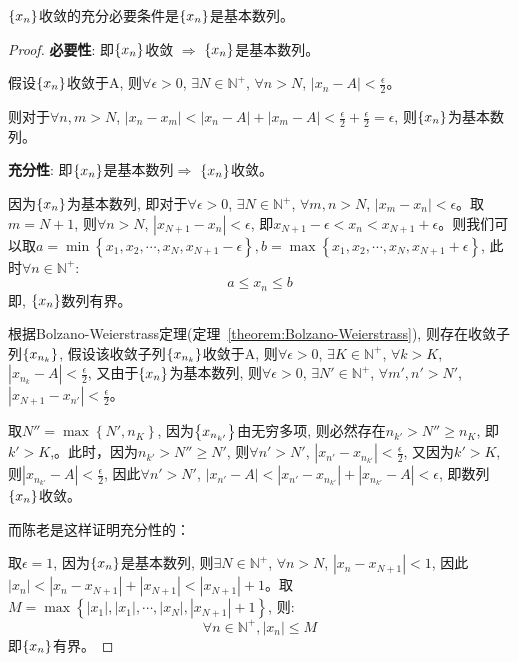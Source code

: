 \documentclass[lang=cn]{elegantbook}
\begin{document}
\begin{theorem}[Cauchy收敛原理]
    $\left\{ x_n\right\}$收敛的充分必要条件是$\left\{ x_n\right\}$是基本数列。
\end{theorem}
\begin{proof}
{\bf 必要性}: 即$\left\{ x_n\right\}$收敛 $\Rightarrow$ $\left\{ x_n\right\}$是基本数列。

假设$\left\{ x_n\right\}$收敛于A, 则$\forall \epsilon > 0$, $\exists N \in \mathbb{N}^+$, $\forall n > N$, $\left| x_n - A \right| < \frac{\epsilon}{2}$。

则对于$\forall n, m > N$, $\left| x_n - x_m \right| < \left| x_n - A \right| + \left| x_m - A \right| < \frac{\epsilon}{2} + \frac{\epsilon}{2} = \epsilon $, 则$\left\{ x_n\right\}$为基本数列。

{\bf 充分性}: 即$\left\{ x_n\right\}$是基本数列$\Rightarrow$ $\left\{ x_n\right\}$收敛。

因为$\left\{ x_n\right\}$为基本数列, 即对于$\forall \epsilon > 0$, $\exists N \in \mathbb{N}^+$, $\forall m, n > N$, $\left| x_m - x_n \right| < \epsilon$。取$m = N + 1$, 则$\forall n > N$, $\left| x_{N+1} - x_n \right| < \epsilon$, 即$x_{N+1} -\epsilon < x_n < x_{N+1} + \epsilon $。则我们可以取$a = \min\left\{ x_1, x_2, \cdots, x_N, x_{N+1} - \epsilon \right\}, b = \max\left\{ x_1, x_2, \cdots, x_N, x_{N+1} + \epsilon \right\}$, 此时$\forall n \in \mathbb{N}^+$:
\[ a \le x_n \le b\]
即, $\left\{ x_n\right\}$数列有界。

根据Bolzano-Weierstrass定理(定理~\ref{theorem:Bolzano-Weierstrass}), 则存在收敛子列$\left\{ x_{n_k}\right\}$, 假设该收敛子列$\left\{ x_{n_k}\right\}$收敛于A, 则$\forall \epsilon > 0$, $\exists K \in \mathbb{N}^+$, $\forall k > K$, $\left| x_{n_k} - A \right| < \frac{\epsilon}{2}$, 又由于$\left\{ x_n\right\}$为基本数列, 则$\forall \epsilon > 0$, $\exists N' \in \mathbb{N}^+$, $\forall m', n' > N'$, $\left| x_{N+1} - x_{n'} \right| < \frac{\epsilon}{2}$。

取$N'' = \max\left\{N', n_K\right\}$, 因为$\left\{ x_{n_{k'}}\right\}$由无穷多项, 则必然存在$n_{k'} > N'' \ge n_K$, 即$k' > K$,。此时，因为$n_{k'} > N'' \ge N'$, 则$\forall n' > N'$, $\left| x_{n'} - x_{n_{k'}}\right| < \frac{\epsilon}{2}$, 又因为$k' > K$, 则$\left| x_{n_{k'}} - A\right| < \frac{\epsilon}{2}$, 因此$\forall n' > N'$, $\left| x_{n'} - A \right| < \left| x_{n'} - x_{n_{k'}} \right| + \left| x_{n_{k'}} - A \right| < \epsilon $, 即数列$\left\{ x_n\right\}$收敛。

而陈老是这样证明充分性的：

取$\epsilon = 1$, 因为$\left\{ x_n\right\}$是基本数列, 则$\exists N \in \mathbb{N}^+$, $\forall n > N$, $\left| x_n - x_{N+1} \right| < 1$, 因此$\left| x_n \right| < \left| x_n - x_{N+1} \right| + \left| x_{N+1} \right| < \left| x_{N+1} \right| + 1$。取$M = \max\left\{\left| x_1 \right|,\left| x_1 \right|,\cdots,\left| x_{N} \right|, \left| x_{N+1} \right| + 1\right\}
$, 则:
\[ \forall n \in \mathbb{N}^+, \left| x_n \right| \le M \]
即$\left\{ x_n\right\}$有界。


\end{proof}
\end{document}
